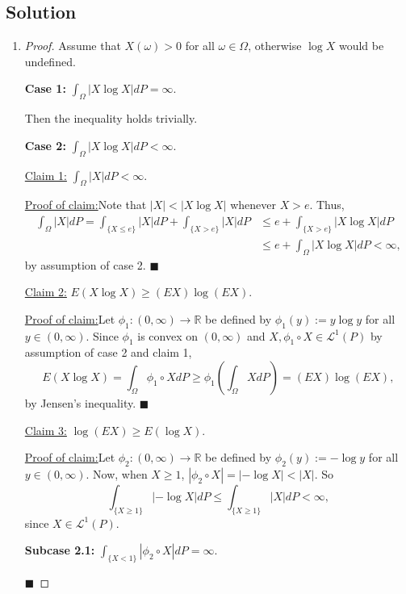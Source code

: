 \documentclass[12pt]{article}
\newenvironment{claimproof}[1]{\par\noindent\underline{Proof of claim:}\space#1}{\hfill $\blacksquare$\vspace{5mm}}
\begin{document}
\subsection*{Solution}
\begin{enumerate}[label=(\alph*)]
\item
\begin{proof}
Assume that $X(\omega) > 0$ for all $\omega \in \Omega$, otherwise $\log X$ would be undefined. 

{\bf Case 1:} $\int_{\Omega}|X\log X|dP = \infty$.

Then the inequality holds trivially.

{\bf Case 2:} $\int_{\Omega}|X\log X|dP < \infty$.

\underline{Claim 1:} $\int_{\Omega}|X| dP < \infty$.
\begin{claimproof}
Note that $|X| < |X\log X|$ whenever $X > e$. Thus, 
\begin{align*}
\int_{\Omega}|X|dP = \int_{\{X \leq e\}}|X|dP + \int_{\{X > e\}}|X|dP & \leq e + \int_{\{X > e\}}|X\log X|dP \\
& \leq e + \int_{\Omega}|X\log X|dP < \infty,
\end{align*}
by assumption of case 2.
\end{claimproof}

\underline{Claim 2:} $E(X\log X) \geq (EX)\log(EX)$.
\begin{claimproof}
Let $\phi_{1} : (0,\infty) \rightarrow \mathbb{R}$ be defined by $\phi_{1}(y) := y\log y$ for all $y \in (0,\infty)$. Since $\phi_{1}$ is convex on
$(0,\infty)$ and $X, \phi_{1}\circ X \in \mathcal{L}^{1}(P)$ by assumption of case 2 and claim 1,
\[ E(X\log X) = \int_{\Omega}\phi_{1}\circ XdP \geq \phi_{1}\left( \int_{\Omega}XdP \right) = (EX)\log(EX),\]
by Jensen's inequality.
\end{claimproof}

\underline{Claim 3:} $\log(EX) \geq E(\log X)$.
\begin{claimproof}
Let $\phi_{2}:(0,\infty) \rightarrow\mathbb{R}$ be defined by $\phi_{2}(y) := -\log y$ for all $y \in (0,\infty)$. Now, when $X \geq 1$,
$|\phi_{2}\circ X| = |-\log X| < |X|$. So 
\begin{equation} 
\int_{\{X \geq 1\}}|-\log X|dP \leq \int_{\{X \geq 1\}}|X| dP < \infty,
\label{4.1}
\end{equation}
since $X \in \mathcal{L}^{1}(P)$.

{\bf Subcase 2.1:} $\int_{\{X < 1\}}|\phi_{2}\circ X|dP = \infty$.


\end{claimproof}
\end{proof}
\end{enumerate}
\end{document}
